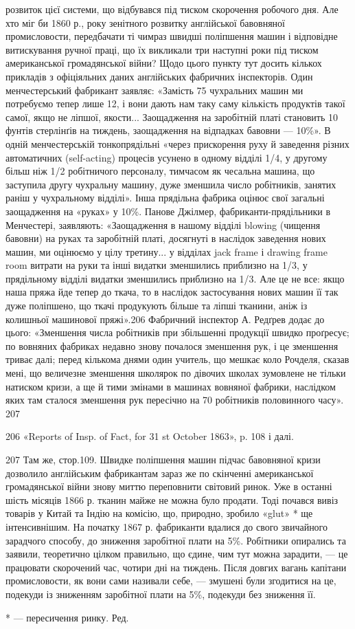 розвиток цієї системи, що відбувався під тиском скорочення
робочого дня. Але хто міг би 1860 р., року зенітного розвитку
англійської бавовняної промисловости, передбачати ті чимраз
швидші поліпшення машин і відповідне витискування ручної
праці, що їх викликали три наступні роки під тиском американської
громадянської війни? Щодо цього пункту тут досить кількох
прикладів з офіціяльних даних англійських фабричних інспекторів.
Один менчестерський фабрикант заявляє: «Замість 75 чухральних
машин ми потребуємо тепер лише 12, і вони дають нам
таку саму кількість продуктів такої самої, якщо не ліпшої,
якости... Заощадження на заробітній платі становить 10 фунтів
стерлінґів на тиждень, заощадження на відпадках бавовни — 10\%».
В одній менчестерській тонкопрядільні «через прискорення руху
й заведення різних автоматичних (self-acting) процесів усунено
в одному відділі 1/4, у другому більш ніж 1/2 робітничого персоналу,
тимчасом як чесальна машина, що заступила другу чухральну
машину, дуже зменшила число робітників, занятих раніш у чухральному
відділі». Інша прядільна фабрика оцінює свої загальні заощадження
на «руках» у 10\%. Панове Джілмер, фабриканти-прядільники
в Менчестері, заявляють: «Заощадження в нашому відділі
blowing (чищення бавовни) на руках та заробітній платі, досягнуті
в наслідок заведення нових машин, ми оцінюємо у цілу третину...
у відділах jack frame і drawing frame room витрати на руки та інші
видатки зменшились приблизно на 1/3, у прядільному відділі видатки
зменшились приблизно на 1/3. Але це не все: якщо наша пряжа
йде тепер до ткача, то в наслідок застосування нових машин її
так дуже поліпшено, що ткачі продукують більше та ліпші тканини,
аніж із колишньої машинової пряжі».206 Фабричний інспектор
А. Редґрев додає до цього: «Зменшення числа робітників
при збільшенні продукції швидко проґресує; по вовняних фабриках
недавно знову почалося зменшення рук, і це зменшення триває
далі; перед кількома днями один учитель, що мешкає коло Рочделя,
сказав мені, що величезне зменшення школярок по дівочих школах
зумовлене не тільки натиском кризи, а ще й тими змінами
в машинах вовняної фабрики, наслідком яких там сталося зменшення
рук пересічно на 70 робітників половинного часу». 207

206 «Reports of Insp. of Fact, for 31 st October 1863», p. 108 і далі.

207 Там же, стор.109. Швидке поліпшення машин підчас бавовняної
кризи дозволило англійським фабрикантам зараз же по скінченні американської
громадянської війни знову миттю переповнити світовий ринок.
Уже в останні шість місяців 1866 р. тканин майже не можна було продати.
Тоді почався вивіз товарів у Китай та Індію на комісію, що, природно,
зробило «glut» * ще інтенсивнішим. На початку 1867 р. фабриканти вдалися
до свого звичайного зарадчого способу, до зниження заробітної
плати на 5\%. Робітники опирались та заявили, теоретично цілком правильно,
що єдине, чим тут можна зарадити, — це працювати скорочений
час, чотири дні на тиждень. Після довгих вагань капітани промисловости,
як вони сами називали себе, — змушені були згодитися на це, подекуди
із зниженням заробітної плати на 5\%, подекуди без зниження її.

* — пересичення ринку. Ред.
